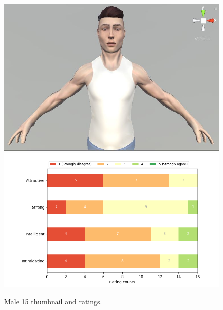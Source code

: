\begin{figure}[H]
  \includegraphics[width=\linewidth]{Images/Males/15.JPG}
\endminipage\hfill
{}
  \includegraphics[width=\linewidth]{Survey/MRatings/avatar_m15.png}
\endminipage\hfill
\caption{Male 15 thumbnail and ratings.}
\end{figure}

